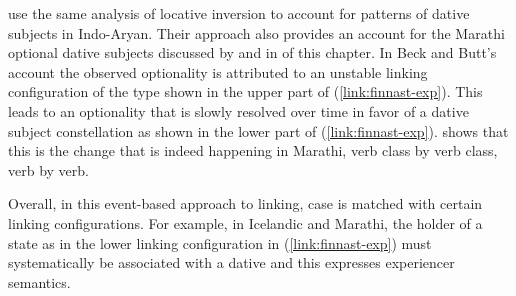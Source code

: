 \documentclass[output=paper,hidelinks]{langscibook}
\begin{document}



\citet{beck-butt2021} use the same analysis of locative inversion to account for
patterns of dative subjects in Indo-Aryan.  Their approach also provides an
account for the Marathi optional dative subjects discussed by \citet{Asudeh01} and in  of this chapter. In Beck and Butt's account the observed optionality is
attributed to an unstable linking configuration of the type shown in the upper
part of (\ref{link:finnast-exp}).  This leads to an optionality that is slowly
resolved over time in favor of a dative subject constellation as shown
in the lower part of  (\ref{link:finnast-exp}).  \citet{Deo2003} shows that this
is the change that is indeed happening in Marathi, verb class by verb class,
verb by verb. 

Overall, 
in this event-based approach to linking, case is matched with certain linking
configurations.  For example, in Icelandic and Marathi, the holder of a state as
in the lower linking configuration in (\ref{link:finnast-exp}) must systematically
be associated with a dative and this expresses experiencer semantics.


\end{document}
